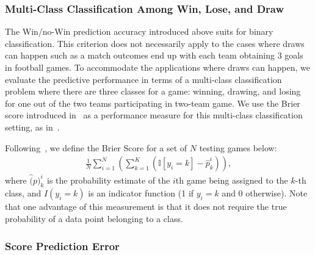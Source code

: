 \subsubsection{Multi-Class Classification Among Win, Lose, and Draw}
\label{sec:multiclassClassification}
The Win/no-Win prediction accuracy introduced above suits for binary classification. This criterion does not necessarily apply to the cases where draws can happen such as a match outcomes end up with each team obtaining 3 goals in football games. To accommodate the applications where draws can happen, we evaluate the predictive performance in terms of a multi-class classification problem where there are three classes for a game: winning, drawing, and losing for one out of the two teams participating in two-team game. We use the Brier score introduced in~\cite{Brier:BrierScore} as a performance measure for this multi-class classification setting, as in~\cite{huang06GeneralizedBradleyTerryModels}. 

Following~\cite{huang06GeneralizedBradleyTerryModels}, we define the Brier Score for a set of $N$ testing games below:
\begin{align}
	\frac{1}{N}\sum_{i=1}^{N}\left( \sum_{k=1}^{K} \left(\mathbb{I}[y_i = k] - \hat{p}_{k}^{i}\right)  \right),
\end{align}
where $\hat(p)_{k}^{i}$ is the probability estimate of the $i$th game being assigned to the $k$-th class, and $I(y_i = k)$ is an indicator function (1 if $y_i=k$ and 0 otherwise). Note that one advantage of this measurement is that it does not require the true probability of a data point belonging to a class. 

\subsubsection{Score Prediction Error}
\label{sec:scorePredictionError}





